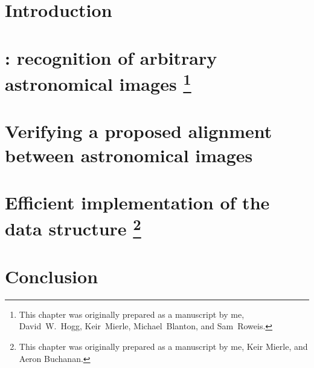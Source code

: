 \documentclass[letterpaper]{ut-thesis}
\begin{document}
\numberparagraphs

\chapter{Introduction}
\graphicspath{{figs-review/}}


\chapter[\antitle: recognizing astronomical images]
		{\an: recognition of arbitrary astronomical images%
		  \footnote{This chapter was originally prepared as a manuscript
			by me, David~W.~Hogg, Keir~Mierle, Michael~Blanton, and
			Sam~Roweis.}}
\label{chap:techreport}
\graphicspath{{figs-techreport/}}


\chapter[Verifying an astrometric alignment]
        {Verifying a proposed alignment between astronomical images}
\label{chap:verify}
\graphicspath{{figs-verify/}}


\chapter[Efficient implementation of \kdtreestitle]
		{Efficient implementation of the \kdtreetitle data structure%
        \footnote{This chapter was originally prepared as a manuscript
        by me, Keir Mierle, and Aeron Buchanan.}}
\label{chap:kdtree}
\graphicspath{{figs-kdtree/}}


\chapter{Conclusion}
\label{chap:conclusion}


\nonumberparagraphs




\end{document}
